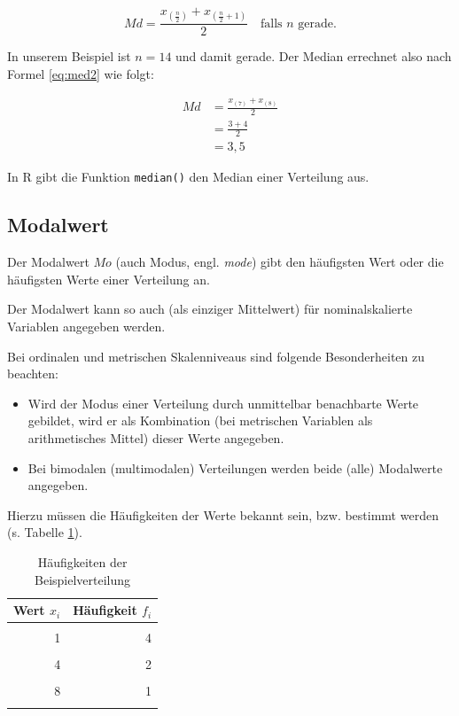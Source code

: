 \documentclass[
  11pt,
  ngerman,
  a4paper,
]{report}
\providecommand{\tightlist}{%
  \setlength{\itemsep}{0pt}\setlength{\parskip}{0pt}}
\newenvironment{rtip}{
  \medskip
  \begin{tcolorbox}[colframe=purple,colback=light_gray,title=Softwarehinweis]
}{
  \end{tcolorbox}
  \medskip
}
\begin{document}
\[
  \mathit{Md} = \frac{x_{(\frac{n}{2})} + x_{(\frac{n}{2}+1)}}{2} \quad \text{falls } n \text{ gerade.}
  \label{eq:med2}
\]

In unserem Beispiel ist \(n=14\) und damit gerade. Der Median errechnet also nach Formel \eqref{eq:med2} wie folgt:

\[
  \begin{aligned}
    \mathit{Md} & = \frac{x_{(7)} + x_{(8)}}{2} \\[4pt]
                & = \frac{3 + 4}{2} \\[4pt]
                & = 3{,}5
  \end{aligned}
\]

\begin{rtip}
In R gibt die Funktion \verb|median()| den Median einer Verteilung aus.
\end{rtip}

\hypertarget{modalwert}{%
\subsection{Modalwert}\label{modalwert}}

Der Modalwert \(\mathit{Mo}\) (auch Modus, engl. \emph{mode}) gibt den häufigsten Wert oder die häufigsten Werte einer Verteilung an.

Der Modalwert kann so auch (als einziger Mittelwert) für nominalskalierte Variablen angegeben werden.

Bei ordinalen und metrischen Skalenniveaus sind folgende Besonderheiten zu beachten:

\begin{itemize}
\tightlist
\item
  Wird der Modus einer Verteilung durch unmittelbar benachbarte Werte gebildet, wird er als Kombination (bei metrischen Variablen als arithmetisches Mittel) dieser Werte angegeben.
\item
  Bei bimodalen (multimodalen) Verteilungen werden beide (alle) Modalwerte angegeben.
\end{itemize}

Hierzu müssen die Häufigkeiten der Werte bekannt sein, bzw. bestimmt werden (s. Tabelle \ref{tab:mod}).

\begin{table}

\caption{\label{tab:mod}Häufigkeiten der Beispielverteilung}
\centering
\begin{tabular}[t]{rr}
\toprule
\textbf{Wert $x_i$} & \textbf{Häufigkeit $f_i$}\\
\midrule
\cellcolor{gray!6}{0} & \cellcolor{gray!6}{1}\\
1 & 4\\
\cellcolor{gray!6}{3} & \cellcolor{gray!6}{2}\\
4 & 2\\
\cellcolor{gray!6}{5} & \cellcolor{gray!6}{3}\\
8 & 1\\
\cellcolor{gray!6}{25} & \cellcolor{gray!6}{1}\\
\bottomrule
\end{tabular}
\end{table}
\end{document}
